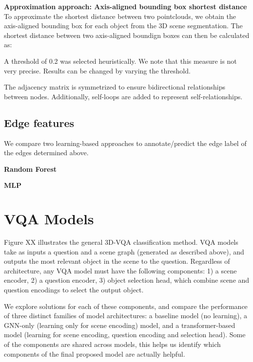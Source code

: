 \bigskip
\noindent
\textbf{Approximation approach: Axis-aligned bounding box shortest distance}
To approximate the shortest distance between two pointclouds, we obtain the axis-aligned bounding box for each object from the 3D scene segmentation. The shortest distance between two axis-aligned boundign boxes can then be calculated as:


A threshold of 0.2 was selected heuristically. We note that this measure is not very precise. Results can be changed by varying the threshold.

The adjacency matrix is symmetrized to ensure bidirectional relationships between nodes. Additionally, self-loops are added to represent self-relationships.

\subsection{Edge features}
We compare two learning-based approaches to annotate/predict the edge label of the edges determined above.

\bigskip
\noindent
\textbf{Random Forest}

\bigskip
\noindent
\textbf{MLP}






\newpage
\section{VQA Models}

Figure XX illustrates the general 3D-VQA classification method. VQA models take as inputs a question and a scene graph (generated as described above), and outputs the most relevant object in the scene to the question. Regardless of architecture, any VQA model must have the following components: 1) a scene encoder, 2) a question encoder, 3) object selection head, which combine scene and question encodings to select the output object.

We explore solutions for each of these components, and compare the performance of three distinct families of model architectures: a baseline model (no learning), a GNN-only (learning only for scene encoding) model, and a transformer-based model (learning for scene encoding, question encoding and selection head). Some of the components are shared across models, this helps us identify which components of the final proposed model are actually helpful.

